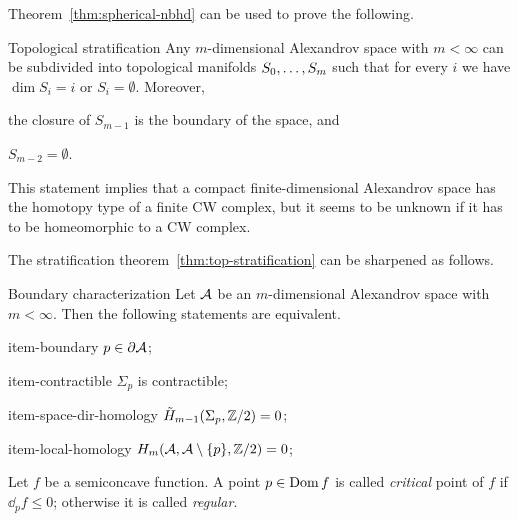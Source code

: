 Theorem~\ref{thm:spherical-nbhd} can be used to prove the following. 

\begin{thm}{Topological stratification}\label{thm:top-stratification}
Any $m$-dimensional Alexandrov space with $m<\infty$ can be subdivided into topological manifolds $S_0,\dots,S_m$ such that for every $i$ we have $\dim S_i=i$ or $S_i=\emptyset$.
Moreover,
\begin{subthm}{}
the closure of $S_{m-1}$ is the boundary of the space, and
\end{subthm}

\begin{subthm}{}
$S_{m-2}=\emptyset$.
\end{subthm}

\end{thm}

This statement implies that a compact finite-dimensional Alexandrov space has the homotopy type of a finite CW complex,
but it seems to be unknown if it has to be homeomorphic to a CW complex.

The stratification theorem~\ref{thm:top-stratification} can be sharpened as follows.

\begin{thm}{Boundary characterization}
Let $\mathcal{A}$ be an $m$-dimensional Alexandrov space with $m<\infty$.
Then the following statements are equivalent.

\begin{subthm}{item-boundary} $p\in \partial \mathcal{A}$;
\end{subthm}

\begin{subthm}{item-contractible} $\Sigma_p$ is contractible;
\end{subthm}

\begin{subthm}{item-space-dir-homology} $\tilde H_{m-1}(\Sigma_p,\mathbb{Z}/2)= 0$;
\end{subthm}

\begin{subthm}{item-local-homology} $H_m(\mathcal{A},\mathcal{A}\setminus \{p\},\mathbb{Z}/2)= 0$;
\end{subthm}

\end{thm}

Let $f$ be a semiconcave function.
A point $p\in \mathop{\rm Dom}\nolimits f$ is called \emph{critical} point of $f$ if $\dd_pf\le 0$; 
otherwise it is called \emph{regular}.


